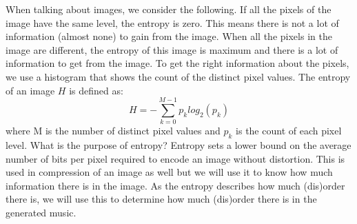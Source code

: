 \documentclass[12pt]{article}
\begin{document}
When talking about images, we consider the following. If all the pixels of the image have the same level, the entropy is zero. This means there is not a lot of information (almost none) to gain from the image. When all the pixels in the image are different, the entropy of this image is maximum and there is a lot of information to get from the image.
\newline
\newline
To get the right information about the pixels, we use a histogram that shows the count of the distinct pixel values. 
\newline
\newline
The entropy of an image $H$ is defined as:
\begin{equation}
H = - \sum_{k=0}^{M-1} p_k log_2 (p_k)
\end{equation}
where M is the number of distinct pixel values and $p_k$ is the count of each pixel level.
\newline
\newline
What is the purpose of entropy? Entropy sets a lower bound on the average number of bits per pixel required to encode an image without distortion. This is used in compression of an image as well but we will use it to know how much  information there is in the image. 
As the entropy describes how much (dis)order there is, we will use this to determine how much (dis)order there is in the generated music. 
\end{document}
